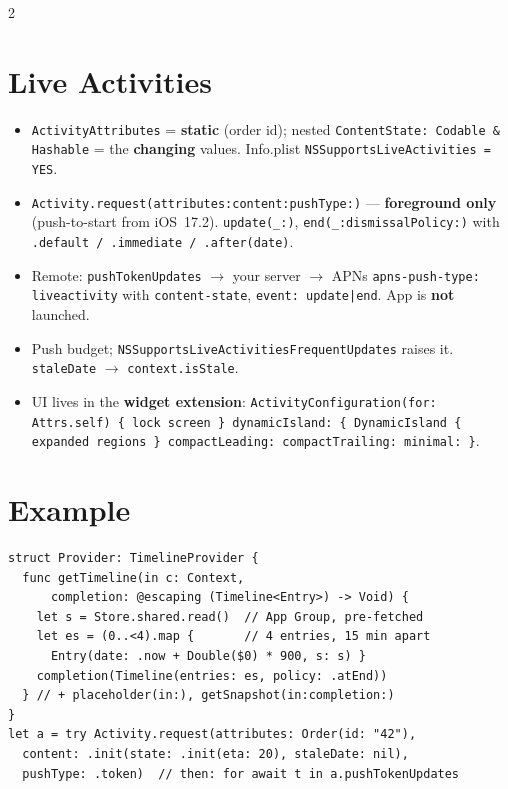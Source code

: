 \documentclass[8pt]{extarticle}
\begin{document}
\begin{multicols}{2}
\section{Live Activities}
\begin{itemize}
  \item \texttt{ActivityAttributes} = \textbf{static} (order id); nested
        \texttt{ContentState: Codable \& Hashable} = the \textbf{changing}
        values. Info.plist \texttt{NSSupportsLiveActivities = YES}.
  \item \texttt{Activity.request(attributes:content:pushType:)} —
        \textbf{foreground only} (push-to-start from iOS~17.2).
        \texttt{update(\_:)}, \texttt{end(\_:dismissalPolicy:)} with
        \texttt{.default / .immediate / .after(date)}.
  \item Remote: \texttt{pushTokenUpdates} $\to$ your server $\to$ APNs
        \texttt{apns-push-type: liveactivity} with \texttt{content-state},
        \texttt{event: update|end}. App is \textbf{not} launched.
  \item Push budget; \texttt{NSSupportsLiveActivitiesFrequentUpdates} raises
        it. \texttt{staleDate} $\to$ \texttt{context.isStale}.
  \item UI lives in the \textbf{widget extension}:
        \texttt{ActivityConfiguration(for: Attrs.self) \{ lock screen \}
        dynamicIsland: \{ DynamicIsland \{ expanded regions \}
        compactLeading: compactTrailing: minimal: \}}.
\end{itemize}

\section{Example}
\begin{lstlisting}[language=SwiftSheet]
struct Provider: TimelineProvider {
  func getTimeline(in c: Context,
      completion: @escaping (Timeline<Entry>) -> Void) {
    let s = Store.shared.read()  // App Group, pre-fetched
    let es = (0..<4).map {       // 4 entries, 15 min apart
      Entry(date: .now + Double($0) * 900, s: s) }
    completion(Timeline(entries: es, policy: .atEnd))
  } // + placeholder(in:), getSnapshot(in:completion:)
}
let a = try Activity.request(attributes: Order(id: "42"),
  content: .init(state: .init(eta: 20), staleDate: nil),
  pushType: .token)  // then: for await t in a.pushTokenUpdates
\end{lstlisting}

\columnbreak


\end{multicols}
\end{document}
